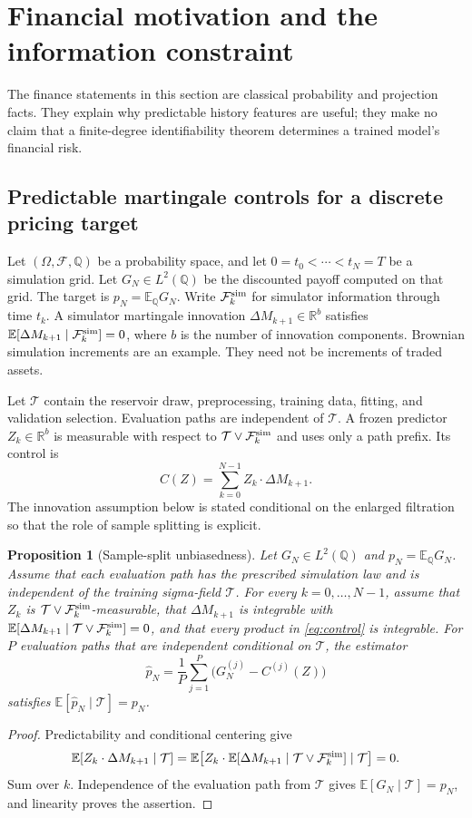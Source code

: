 \documentclass[11pt,a4paper]{article}
\numberwithin{equation}{section}
\newtheorem{proposition}[theorem]{Proposition}
\theoremstyle{definition}
\theoremstyle{remark}
\newcommand{\R}{\mathbb R}
\newcommand{\E}{\mathbb E}
\begin{document}
\section{Financial motivation and the information constraint}
\label{sec:finance}
The finance statements in this section are classical probability and
projection facts. They explain why predictable history features are useful;
they make no claim that a finite-degree identifiability theorem determines a
trained model's financial risk.

\subsection{Predictable martingale controls for a discrete pricing target}
Let $(\Omega,\mathcal F,\mathbb Q)$ be a probability space, and let
$0=t_0<\cdots<t_N=T$ be a simulation grid. Let $G_N\in L^2(\mathbb Q)$ be
the discounted payoff computed on that grid. The target is
$p_N=\E_{\mathbb Q}G_N$. Write $\mathcal F_k^{\rm sim}$ for simulator
information through time $t_k$. A simulator martingale innovation
$\Delta M_{k+1}\in\R^b$ satisfies
$\E[\Delta M_{k+1}\mid\mathcal F_k^{\rm sim}]=0$, where $b$ is the number
of innovation components. Brownian simulation increments are an example.
They need not be increments of traded assets.

Let $\mathcal T$ contain the reservoir draw, preprocessing, training data,
fitting, and validation selection. Evaluation paths are independent of
$\mathcal T$. A frozen predictor $Z_k\in\R^b$ is measurable with respect
to $\mathcal T\vee\mathcal F_k^{\rm sim}$ and uses only a path prefix. Its
control is
\begin{equation}\label{eq:control}
 C(Z)=\sum_{k=0}^{N-1}Z_k\cdot\Delta M_{k+1}.
\end{equation}
The innovation assumption below is stated conditional on the enlarged
filtration so that the role of sample splitting is explicit.

\begin{proposition}[Sample-split unbiasedness]\label{prop:unbiased}
Let $G_N\in L^2(\mathbb Q)$ and $p_N=\E_{\mathbb Q}G_N$. Assume that
each evaluation path has the prescribed simulation law and is independent
of the training sigma-field $\mathcal T$. For every $k=0,\ldots,N-1$,
assume that $Z_k$ is $\mathcal T\vee\mathcal F_k^{\rm sim}$-measurable,
that $\Delta M_{k+1}$ is integrable with
$\E[\Delta M_{k+1}\mid\mathcal T\vee\mathcal F_k^{\rm sim}]=0$, and
that every product in \eqref{eq:control} is integrable. For $P$ evaluation
paths that are independent conditional on $\mathcal T$, the estimator
\[
 \widehat p_N=\frac1P\sum_{j=1}^P\bigl(G_N^{(j)}-C^{(j)}(Z)\bigr)
\]
satisfies $\E[\widehat p_N\mid\mathcal T]=p_N$.
\end{proposition}
\begin{proof}
Predictability and conditional centering give
\[
 \E[Z_k\cdot\Delta M_{k+1}\mid\mathcal T]
 =\E\!\left[Z_k\cdot
 \E[\Delta M_{k+1}\mid\mathcal T\vee\mathcal F_k^{\rm sim}]
 \mid\mathcal T\right]=0.
\]
Sum over $k$. Independence of the evaluation path from $\mathcal T$ gives
$\E[G_N\mid\mathcal T]=p_N$, and linearity proves the assertion.
\end{proof}
\end{document}
